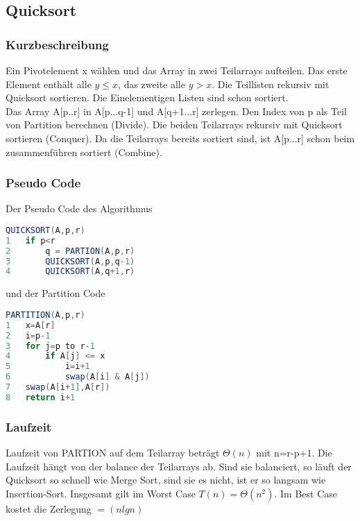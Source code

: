 \documentclass[jou,apacite]{apa6}
\begin{document}
\subsection{Quicksort}

\subsubsection{Kurzbeschreibung}
Ein Pivotelement x wählen und das Array in zwei Teilarrays aufteilen. Das erste Element enthält alle $y\le x$, das zweite alle $y>x$. Die Teillisten rekursiv mit Quicksort sortieren. Die Einelementigen Listen sind schon sortiert. \\
Das Array A[p..r] in A[p...q-1] und A[q+1...r] zerlegen. Den Index von p als Teil von Partition berechnen (Divide). Die beiden Teilarrays rekursiv mit Quicksort sortieren (Conquer). Da die Teilarrays bereits sortiert sind, ist A[p...r] schon beim zusammenführen sortiert (Combine). 

\subsubsection{Pseudo Code}
Der Pseudo Code des Algorithmus 
\begin{lstlisting}[language=Java]
QUICKSORT(A,p,r)
1   if p<r
2       q = PARTION(A,p,r)
3       QUICKSORT(A,p,q-1)
4       QUICKSORT(A,q+1,r)
\end{lstlisting}
und der Partition Code
\begin{lstlisting}[language=java]
PARTITION(A,p,r)
1   x=A[r]
2   i=p-1
3   for j=p to r-1
4       if A[j] <= x
5           i=i+1
6           swap(A[i] & A[j])
7   swap(A[i+1],A[r])
8   return i+1
\end{lstlisting}

\subsubsection{Laufzeit}
Laufzeit von PARTION auf dem Teilarray beträgt $\Theta(n)$ mit n=r-p+1. Die Laufzeit hängt von der balance der Teilarrays ab. Sind sie balanciert, so läuft der Quicksort so schnell wie Merge Sort, sind sie es nicht, ist er so langsam wie Insertion-Sort. Insgesamt gilt im Worst Case $T(n)=\Theta(n^2)$. Im Best Case kostet die Zerlegung $=(n lg n)$
\end{document}
